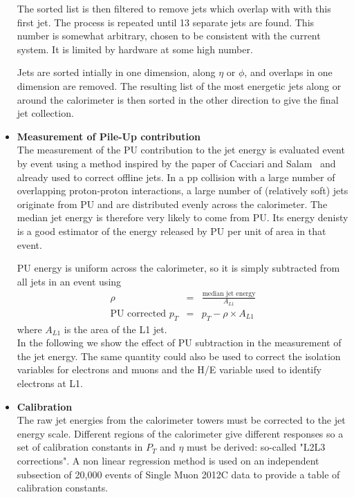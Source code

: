 \begin{itemize}
 The sorted list is then filtered to remove jets which overlap with with this first jet.
 The process is repeated until 13 separate jets are found. 
 This number is somewhat arbitrary, chosen to be consistent with the current system. 
 It is limited by hardware at some high number.
 
Jets are sorted intially in one dimension, along $\eta$ or $\phi$, and overlaps in one dimension are removed. 
The resulting list of the most energetic jets along or around the calorimeter is then sorted in the other direction to give the final jet collection.


\item {\bf Measurement of Pile-Up contribution} \\
The measurement of the PU contribution to the jet energy 
is evaluated event by event using a method inspired by the paper of 
Cacciari and Salam~\cite{rho} and already used to correct offline jets.
In a pp collision with a large number of overlapping proton-proton interactions, 
a large number of (relatively soft) jets originate from PU and are distributed 
evenly across the calorimeter.  
The median jet energy is therefore very likely to come from PU.
Its energy denisty is a good estimator of the energy released 
by PU per unit of area in that event.


PU energy is uniform across the calorimeter, so it
is simply subtracted from all jets in an event using
\begin{eqnarray}
 \rho &=& \frac{\text{median jet energy}}{A_{L1}} \\
 \text{PU corrected }p_{T} &=& p_{T} - \rho \times A_{L1} 
\end{eqnarray}
where $A_{L1}$ is the area of the L1 jet. \\
In the following we show the effect of PU subtraction in the measurement of the
jet energy. The same quantity could also be used to correct the isolation 
variables for electrons and muons and the H/E variable used to identify 
electrons at L1.


\item {\bf Calibration} \\
The raw jet energies from the calorimeter towers must be corrected to the jet energy scale. 
Different regions of the calorimeter give different responses so a set of calibration constants 
in $P_{T}$ and $\eta$ must be derived: so-called "L2L3 corrections".
A non linear regression method is used on an independent subsection of 
20,000 events of Single Muon 2012C data to provide a table of calibration constants.


\end{itemize}
